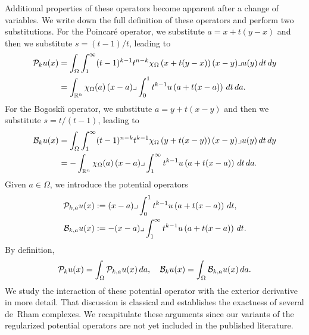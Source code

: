 \documentclass[10pt,letterpaper]{article}
\begin{document}
Additional properties of these operators become apparent after a change of variables. 
We write down the full definition of these operators and perform two substitutions.
For the Poincar\'e operator, we substitute $a = x + t(y-x)$ and then we substitute $s = (t-1)/t$,
leading to 
\begin{align*}
    {\mathcal P}_{k} u(x) 
    &= 
    \int_{\Omega} \int_{1}^\infty (t-1)^{k-1}t^{n-k} 
    \chi_{\Omega}\left(x+t(y-x)\right) 
    (x-y)\lrcorner u(y) \,dt\,dy 
    \\
    &=
    \int_{{\mathbb R}^{n}} \chi_{\Omega}(a) \,(x-a)\lrcorner \int_{0}^{1} t^{k-1} u\left(a+t(x-a)\right)\,dt\,da
    .
\end{align*}
For the Bogoski\u{\i} operator, we substitute $a = y + t(x-y)$ and then we substitute $s = t/(t-1)$,
leading to 
\begin{align*}
    {\mathcal B}_{k} u(x) 
    &= 
    \int_{\Omega} \int_{1}^\infty (t-1)^{n-k}t^{k-1} 
    \chi_{\Omega}\left(y+t(x-y)\right) 
    (x-y)\lrcorner u(y) \,dt\,dy 
    \\
    &=
    - \int_{{\mathbb R}^{n}} \chi_{\Omega}(a) \,(x-a)\lrcorner \int_{1}^\infty t^{k-1} u\left(a+t(x-a)\right)\,dt\,da
    .
\end{align*}
% 
Given $a \in \Omega$, we introduce the potential operators 
\begin{align*}
    {\mathcal P}_{k,a} u(x) 
    &:= 
    (x-a)\lrcorner \int_{0}^{1} t^{k-1} u\left(a+t(x-a)\right)\,dt
    ,
    \\
    {\mathcal B}_{k,a} u(x) 
    &:= 
    - (x-a)\lrcorner \int_{1}^\infty t^{k-1} u\left(a+t(x-a)\right)\,dt
    .
\end{align*}
By definition,
\begin{align*}
    {\mathcal P}_{k} u(x) 
    =
    \int_{\Omega} {\mathcal P}_{k,a} u(x) \,da,
    \quad 
    {\mathcal B}_{k} u(x) 
    =
    \int_{\Omega} {\mathcal B}_{k,a} u(x) \,da
    .
\end{align*}
We study the interaction of these potential operator with the exterior derivative in more detail.
% 
That discussion is classical and establishes the exactness of several de~Rham complexes. 
We recapitulate these arguments since our variants of the regularized potential operators 
are not yet included in the published literature. 
\end{document}
